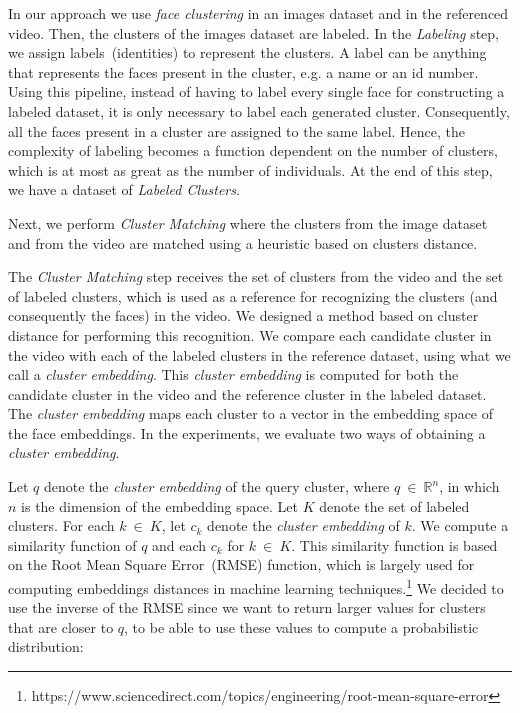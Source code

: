 In our approach we use \emph{face clustering} in an images dataset and in the referenced video. Then, the clusters of the images dataset are labeled. 
In the \textit{Labeling} step, we assign labels~(identities) to represent the clusters.
A label can be anything that represents the faces present in the cluster, e.g. a name or an id number. 
Using this pipeline, instead of having to label every single face for constructing a labeled dataset, it is only necessary to label each generated cluster.
Consequently, all the faces present in a cluster are assigned to the same label. 
Hence, the complexity of labeling becomes a function dependent on the number of clusters, which is at most as great as the number of individuals.
At the end of this step, we have a dataset of \emph{Labeled Clusters}.


Next, we perform \emph{Cluster Matching} where the clusters from the image dataset and from the video are matched using a heuristic based on clusters distance.

The \textit{Cluster Matching} step receives the set of clusters from the video and the set of labeled clusters, which is used as a reference for recognizing the clusters (and consequently the faces) in the video.
We designed a method based on cluster distance for performing this recognition.
We compare each candidate cluster in the video with each of the labeled clusters in the reference dataset, using what we call a \emph{cluster embedding}. This \emph{cluster embedding} is computed for both the candidate cluster in the video and the reference cluster in the labeled dataset.
The \emph{cluster embedding} maps each cluster to a vector in the embedding space of the face embeddings.
In the experiments, we evaluate two ways of obtaining a \emph{cluster embedding}.

Let $q$ denote the \emph{cluster embedding} of the query cluster, where $q~\in~\mathbb{R}^{n}$, in which $n$ is the dimension of the embedding space.
%
Let $K$ denote the set of labeled clusters. For each $k~\in~K$, let $c_k$ denote the \emph{cluster embedding} of $k$. 
%
We compute a similarity function of $q$ and each $c_k$ for $k~\in~K$. 
This similarity function is based on the Root Mean Square Error~(RMSE) function, which is largely used for computing embeddings distances in machine learning techniques.\footnote{https://www.sciencedirect.com/topics/engineering/root-mean-square-error}
We decided to use the inverse of the RMSE since we want to return larger values for clusters that are closer to $q$, to be able to use these values to compute a probabilistic distribution:

